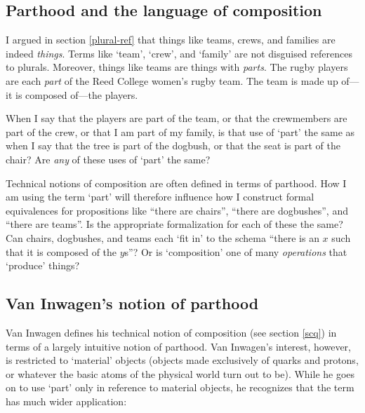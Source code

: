 \documentclass[11pt]{article}
\begin{document}
\begin{spacing}{1.5}
\section{Parthood and the language of composition}
\label{parthood}
I argued in section \ref{plural-ref} that things like teams, crews,
and families are indeed {\em things}.  Terms like `team', `crew', and
`family' are not disguised references to plurals.  Moreover, things
like teams are things with {\em parts}.  The rugby players are each
{\em part} of the Reed College women's rugby team.  The team is made
up of---it is composed of---the players.

When I say that the players are part of the team, or that the
crewmembers are part of the crew, or that I am part of my family, is
that use of `part' the same as when I say that the tree is part of the
dogbush, or that the seat is part of the chair?  Are {\em any} of
these uses of `part' the same?

Technical notions of composition are often defined in terms of
parthood.  How I am using the term `part' will therefore influence how
I construct formal equivalences for propositions like ``there are
chairs'', ``there are dogbushes'', and ``there are teams''.  Is the
appropriate formalization for each of these the same?  Can chairs,
dogbushes, and teams each `fit in' to the schema ``there is an $x$
such that it is composed of the $y$s''?  Or is `composition' one of
many {\em operations} that `produce' things?

\subsection{Van Inwagen's notion of parthood}
\label{van-part}
Van Inwagen defines his technical notion of composition (see section
\ref{scq}) in terms of a largely intuitive notion of parthood.  Van
Inwagen's interest, however, is restricted to `material' objects
(objects made exclusively of quarks and protons, or whatever the basic
atoms of the physical world turn out to be).  While he goes on to use
`part' only in reference to material objects, he recognizes that the
term has much wider application:


\end{spacing}
\end{document}
